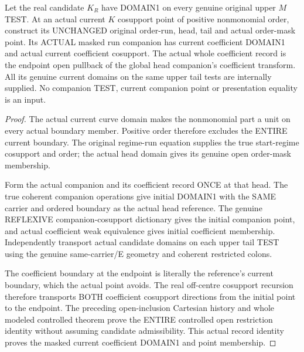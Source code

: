 \begin{theorem}
\label{hir:original-untested-curve-run-companion-current-bar-data}
\leanok
Let the real candidate $K_R$ have DOMAIN1 on every genuine original
upper $M$ TEST. At an actual current $K$ cosupport point of positive
nonmonomial order, construct its UNCHANGED original order-run, head,
tail and actual order-mask point. Its ACTUAL masked run companion has
current coefficient DOMAIN1 and actual current coefficient cosupport.
The actual whole coefficient record is the endpoint open pullback of
the global head companion's coefficient transform. All its genuine
current domains on the same upper tail tests are internally supplied.
No companion TEST, current companion point or presentation equality is
an input.
\end{theorem}
\begin{proof}
The actual current curve domain makes the nonmonomial part a unit on
every actual boundary member. Positive order therefore excludes the
ENTIRE current boundary. The original regime-run equation supplies the
true start-regime cosupport and order; the actual head domain gives its
genuine open order-mask membership.

Form the actual companion and its coefficient record ONCE at that head.
The true coherent companion operations give initial DOMAIN1 with the
SAME carrier and ordered boundary as the actual head reference. The
genuine REFLEXIVE companion-cosupport dictionary gives the initial
companion point, and actual coefficient weak equivalence gives initial
coefficient membership. Independently transport actual candidate
domains on each upper tail TEST using the genuine same-carrier/E
geometry and coherent restricted colons.

The coefficient boundary at the endpoint is literally the reference's
current boundary, which the actual point avoids. The real off-centre
cosupport recursion therefore transports BOTH coefficient cosupport
directions from the initial point to the endpoint. The preceding
open-inclusion Cartesian history and whole modeled controlled theorem
prove the ENTIRE controlled open restriction identity without assuming
candidate admissibility. This actual record identity proves the
masked current coefficient DOMAIN1 and point membership.
\end{proof}


